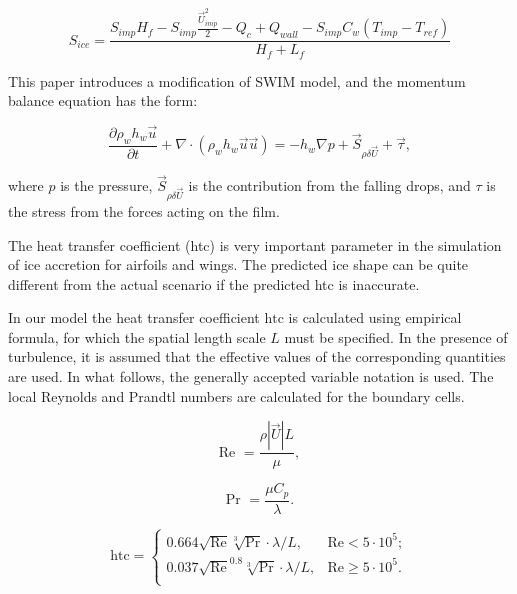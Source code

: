 \documentclass[aerospace,article,submit,moreauthors,pdftex]{Definitions/mdpi}
\begin{document}
\begin{equation}
    S_{ice} = \frac{S_{imp} H_{f} - S_{imp}\frac{\vec U_{imp}^{2}}{2}  - Q_{c} + Q_{wall} - S_{imp}C_{w}\left( T_{imp} - T_{ref} \right)}{H_{f} + L_{f}}   
\end{equation}

This paper introduces a modification of SWIM model, and the momentum balance equation has the form:

\begin{equation}
    \frac{\partial\rho_{w}h_{w} \vec u}{\partial t} + \nabla \cdot  \left( \rho_{w}h_{w} \vec u \vec u \right) = - h_{w}\nabla p + \vec S_{\rho \delta \vec U} + \vec \tau,
\end{equation}

where $p$ is the pressure, $\vec S_{\rho \delta \vec U}$ is the contribution from the falling drops, and $\tau$ is the stress from the forces acting on the film.

The heat transfer coefficient (htc) is very important parameter in the simulation of ice accretion for airfoils and wings. The predicted ice shape can be quite different from the actual scenario if the predicted htc is inaccurate.

In our model the heat transfer coefficient $\text{htc}$ is calculated using empirical formula, for which the spatial length scale $L$ must be specified. In the presence of turbulence, it is assumed that the effective values of the corresponding quantities are used. In what follows, the generally accepted variable notation is used. The local Reynolds and Prandtl numbers are calculated for the boundary cells.

\begin{equation}
    \text{Re } = \frac{\rho |\vec U| L}{ \mu},
    \label{eq:Re}
\end{equation}

\begin{equation}
    \text{Pr } = \frac{\mu C_p}{\lambda}.
    \label{eq:Pr}
\end{equation}

\begin{equation}
    \text{htc} =
    \begin{cases}
        0.664 \sqrt{\text{Re}} \sqrt[3]{\text{Pr}} \cdot \lambda /L, &\text{Re} < 5 \cdot 10^5; \\
        0.037 \sqrt{\text{Re}}^{0.8} \sqrt[3]{\text{Pr}}  \cdot \lambda /L,   &\text{Re} \geq 5 \cdot 10^5. \\
    \end{cases}
\end{equation}
\end{document}
